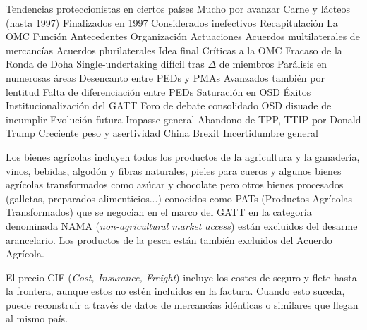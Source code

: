 \documentclass{nuevotema}
\begin{document}
\begin{esquemal}
				\4[] Tendencias proteccionistas en ciertos países
				\4[] Mucho por avanzar
			\3 Carne y lácteos (hasta 1997)
				\4 Finalizados en 1997
				\4 Considerados inefectivos
	\1[] 
		\2 Recapitulación
			\3 La OMC
				\4 Función
				\4 Antecedentes
				\4 Organización
				\4 Actuaciones
			\3 Acuerdos multilaterales de mercancías
			\3 Acuerdos plurilaterales
		\2 Idea final
			\3 Críticas a la OMC
				\4 Fracaso de la Ronda de Doha
				\4 Single-undertaking difícil tras $\varDelta$ de miembros
				\4 Parálisis en numerosas áreas
				\4 Desencanto entre PEDs y PMAs
				\4 Avanzados también por lentitud
				\4 Falta de diferenciación entre PEDs
				\4 Saturación en OSD
			\3 Éxitos
				\4 Institucionalización del GATT
				\4 Foro de debate consolidado
				\4 OSD disuade de incumplir
			\3 Evolución futura
				\4 Impasse general
				\4 Abandono de TPP, TTIP por Donald Trump
				\4 Creciente peso y asertividad China
				\4 Brexit
				\4 Incertidumbre general
\end{esquemal}































\conceptos


Los bienes agrícolas incluyen todos los productos de la agricultura y la ganadería, vinos, bebidas, algodón y fibras naturales, pieles para cueros y algunos bienes agrícolas transformados como azúcar y chocolate pero otros bienes procesados (galletas, preparados alimenticios...) conocidos como PATs (Productos Agrícolas Transformados) que se negocian en el marco del GATT en la categoría denominada NAMA (\textit{non-agricultural market access}) están excluidos del desarme arancelario. Los productos de la pesca están también excluidos del Acuerdo Agrícola.


El precio CIF (\textit{Cost, Insurance, Freight}) incluye los costes de seguro y flete hasta la frontera, aunque estos no estén incluidos en la factura. Cuando esto suceda, puede reconstruir a través de datos de mercancías idénticas o similares que llegan al mismo país.
\end{document}
